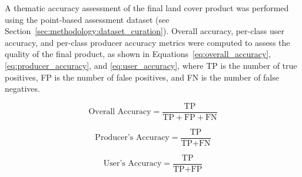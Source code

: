 A thematic accuracy assessment of the final land cover product was performed using the point-based assessment dataset (see Section~\ref{sec:methodology:dataset_curation}).
Overall accuracy, per-class user accuracy, and per-class producer accuracy metrics were computed to assess the quality of the final product, as shown in Equations~\ref{eq:overall_accuracy}, \ref{eq:producer_accuracy}, and \ref{eq:user_accuracy}, where TP is the number of true positives, FP is the number of false positives, and FN is the number of false negatives.

\begin{equation}\label{eq:overall_accuracy}
    \text{Overall Accuracy} = \frac{\text{TP}}{\text{TP} + \text{FP} + \text{FN}}
\end{equation}

\begin{equation}\label{eq:producer_accuracy}
    \text{Producer's Accuracy} = \frac{\text{TP}}{\text{TP} + \text{FN}} 
\end{equation}

\begin{equation}\label{eq:user_accuracy}
    \text{User's Accuracy} = \frac{\text{TP}}{\text{TP} + \text{FP}}
\end{equation}




